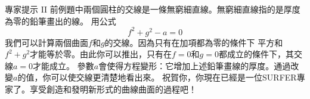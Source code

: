 \begin{surferPage}{專家提示 II}
前例題中兩個圓柱的交線是一條無窮細直線。無窮細直線指的是厚度為零的鉛筆畫出的線。
用公式
\[ f^2+g^2-a=0\]
我們可以計算兩個曲面$f$和$g$的交線。因為只有在加項都為零的條件下
平方和$f^2+g^2$才能等於零。由此你可以推出，只有在$f=0$和$g=0$都成立的條件下，其交線$a=0$才能成立。
參數$a$會使得方程變形：它增加上述鉛筆畫線的厚度。通過改變$a$的值，你可以使交線更清楚地看出來。
\newline \newline
祝賀你，你現在已經是一位SURFER專家了。享受創造和發明新形式的曲線曲面的過程吧！
\end{surferPage}
